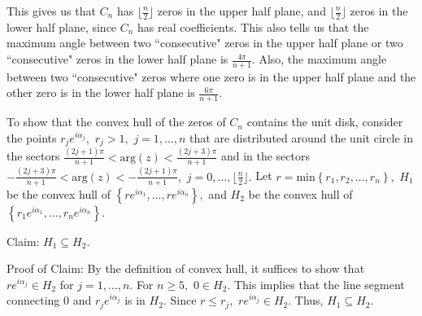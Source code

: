 \documentclass[final]{siamltex}
\begin{document}
This gives us that $C_{n}$ has $\lfloor \frac{n}{2} \rfloor$ zeros in the upper half plane, and $\lfloor \frac{n}{2} \rfloor$ zeros in the lower half plane, since $C_{n}$ has real coefficients. 
 This also tells us that the maximum angle between two ``consecutive" zeros in the upper half plane or two ``consecutive" zeros in the lower half plane is $\frac{4 \pi}{n+1}.$ Also, the maximum angle between two ``consecutive" zeros where one zero is in the upper half plane and the other zero is in the lower half plane is $\frac{6 \pi}{n+1}.$ 

  To show that the convex hull of the zeros of $C_{n}$ contains the unit disk, consider the points $r_{j}e^{i \alpha_{j}},$ $r_{j} > 1,$ $j = 1, \ldots, n$ that are distributed around the unit circle in the sectors $\frac{ (2j+1) \pi}{n+1} < \mbox{arg}(z) < \frac{ (2j+3) \pi}{n+1}$ and in the sectors $-\frac{(2j+3)\pi}{n+1} < \mbox{arg}(z) < -\frac{(2j+1)\pi}{n+1},$ $j = 0, \ldots, \lfloor \frac{n}{2} \rfloor.$ Let $r = \mbox{min} \left\{ r_{1}, r_{2}, \ldots, r_{n} \right\},$ $H_{1}$ be the convex hull of $\left\{ re^{i \alpha_{1}}, \ldots, re^{i \alpha_{n}} \right\},$ and $H_{2}$ be the convex hull of $\left\{ r_{1}e^{i \alpha_{1}}, \ldots, r_{n}e^{i\alpha_{n}} \right\}.$ 


 Claim: $H_{1} \subseteq H_{2}.$ 

 Proof of Claim: By the definition of convex hull, it suffices to show that $re^{i \alpha_{j}} \in H_{2}$ for $j = 1, \ldots, n.$ For $n \geq 5,$ $0 \in H_{2}.$ This implies that the line segment connecting $0$ and $r_{j}e^{i \alpha_{j}}$ is in $H_{2}.$ Since $r \leq r_{j},$ $re^{i \alpha_{j}} \in H_{2}.$ Thus, $H_{1} \subseteq H_{2}.$
\end{document}
